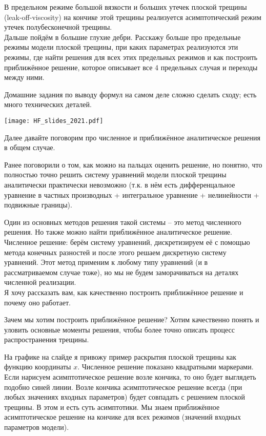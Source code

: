 \documentclass[main.tex]{subfiles}
\begin{document}
В предельном режиме большой вязкости и больших утечек плоской трещины (leak-off-viscosity) на кончике этой трещины реализуется асимптотический режим утечек полубесконечной трещины.
\\

Дальше пойдём в большие глухие дебри.
Расскажу больше про предельные режимы модели плоской трещины, при каких параметрах реализуются эти режимы, где найти решения для всех этих предельных режимов и как построить приближённое решение, которое описывает все 4 предельных случая и переходы между ними.

Домашние задания по выводу формул на самом деле сложно сделать сходу; есть много технических деталей.

\texttt{[image: HF\_slides\_2021.pdf]}

Далее давайте поговорим про численное и приближённое аналитическое  решения в общем случае.

Ранее поговорили о том, как можно на пальцах оценить решение, но понятно, что полностью точно решить систему уравнений модели плоской трещины аналитически практически невозможно (т.к. в нём есть дифференцальное уравнение в частных производных + интегральное уравнение + нелинейности + подвижные границы).

Один из основных методов решения такой системы -- это метод численного решения.
Но также можно найти приближённое аналитическое решение.
\\

Численное решение: берём систему уравнений, дискретизируем её с помощью метода конечных разностей и после этого решаем дискретную систему уравнений.
Этот метод применим к любому типу уравнений (и в рассматриваемом случае тоже), но мы не будем заморачиваться на деталях численной реализации.
\\

Я хочу рассказать вам, как качественно построить приближённое решение и почему оно работает.

Зачем мы хотим построить приближённое решение?
Хотим качественно понять и уловить основные моменты решения, чтобы более точно описать процесс распространения трещины.

На графике на слайде я привожу пример раскрытия плоской трещины как функцию координаты $x$.
Численное решение показано квадратными маркерами.
Если нарисуем асимптотическое решение возле кончика, то оно будет выглядеть подобно синей линии.
Возле кончика асимптотическое решение всегда (при любых значениях входных параметров) будет совпадать с решением плоской трещины.
В этом и есть суть асимптотики.
Мы знаем приближённое асимптотическое решение на кончике для всех режимов (значений входных параметров модели).
\end{document}
